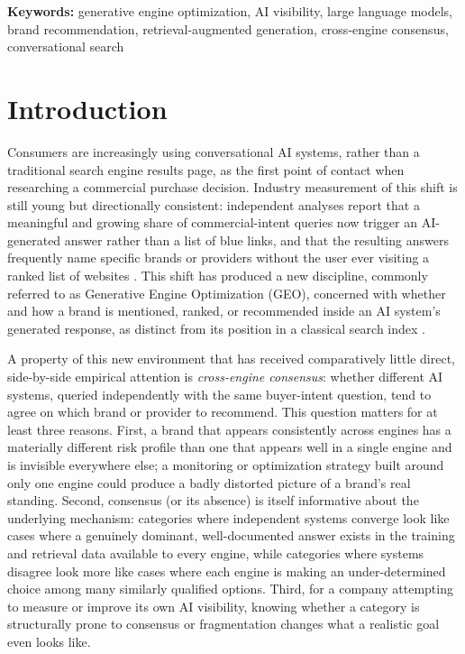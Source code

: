 \documentclass[11pt]{article}
\begin{document}
\noindent\textbf{Keywords:} generative engine optimization, AI visibility, large
language models, brand recommendation, retrieval-augmented generation, cross-engine
consensus, conversational search

\section{Introduction}

Consumers are increasingly using conversational AI systems, rather than a traditional
search engine results page, as the first point of contact when researching a commercial
purchase decision. Industry measurement of this shift is still young but directionally
consistent: independent analyses report that a meaningful and growing share of
commercial-intent queries now trigger an AI-generated answer rather than a list of blue
links, and that the resulting answers frequently name specific brands or providers
without the user ever visiting a ranked list of websites \citep{semrush2026,
brightedge2026}. This shift has produced a new discipline, commonly referred to as
Generative Engine Optimization (GEO), concerned with whether and how a brand is
mentioned, ranked, or recommended inside an AI system's generated response, as distinct
from its position in a classical search index \citep{aggarwal2024geo}.

A property of this new environment that has received comparatively little direct,
side-by-side empirical attention is \emph{cross-engine consensus}: whether different AI
systems, queried independently with the same buyer-intent question, tend to agree on
which brand or provider to recommend. This question matters for at least three reasons.
First, a brand that appears consistently across engines has a materially different risk
profile than one that appears well in a single engine and is invisible everywhere else;
a monitoring or optimization strategy built around only one engine could produce a
badly distorted picture of a brand's real standing. Second, consensus (or its absence)
is itself informative about the underlying mechanism: categories where independent
systems converge look like cases where a genuinely dominant, well-documented answer
exists in the training and retrieval data available to every engine, while categories
where systems disagree look more like cases where each engine is making an
under-determined choice among many similarly qualified options. Third, for a company
attempting to measure or improve its own AI visibility, knowing whether a category is
structurally prone to consensus or fragmentation changes what a realistic goal even
looks like.
\end{document}
